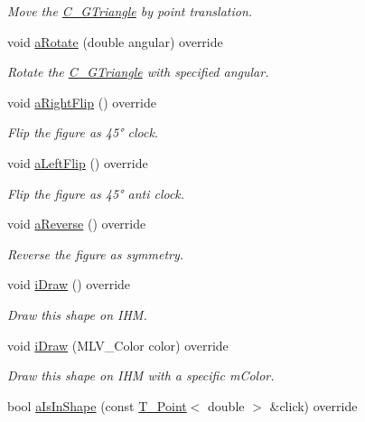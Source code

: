\begin{DoxyCompactItemize}
\begin{DoxyCompactList}\small\item\em Move the \hyperlink{classC__GTriangle}{C\+\_\+\+G\+Triangle} by point translation. \end{DoxyCompactList}\item 
void \hyperlink{classC__GTriangle_a29c641aea4ef5fa4224b42dffc5fefa5}{a\+Rotate} (double angular) override
\begin{DoxyCompactList}\small\item\em Rotate the \hyperlink{classC__GTriangle}{C\+\_\+\+G\+Triangle} with specified angular. \end{DoxyCompactList}\item 
void \hyperlink{classC__GTriangle_aa4f808a02ae18bd36c205a5d70eb3fef}{a\+Right\+Flip} () override
\begin{DoxyCompactList}\small\item\em Flip the figure as 45° clock. \end{DoxyCompactList}\item 
void \hyperlink{classC__GTriangle_a9ffdddb586b42757ffca6a9ca0c20934}{a\+Left\+Flip} () override
\begin{DoxyCompactList}\small\item\em Flip the figure as 45° anti clock. \end{DoxyCompactList}\item 
void \hyperlink{classC__GTriangle_a479646fa1265aaf2299b59787c394a27}{a\+Reverse} () override
\begin{DoxyCompactList}\small\item\em Reverse the figure as symmetry. \end{DoxyCompactList}\item 
void \hyperlink{classC__GTriangle_a53abbd8cd622323fc2f3b80ce91cfde9}{i\+Draw} () override
\begin{DoxyCompactList}\small\item\em Draw this shape on I\+HM. \end{DoxyCompactList}\item 
void \hyperlink{classC__GTriangle_a9cfd20cb1d19e6c92bd217c470c86405}{i\+Draw} (M\+L\+V\+\_\+\+Color color) override
\begin{DoxyCompactList}\small\item\em Draw this shape on I\+HM with a specific m\+Color. \end{DoxyCompactList}\item 
bool \hyperlink{classC__GTriangle_a417b28c74dd35f81a19b5bd1d214ba8d}{a\+Is\+In\+Shape} (const \hyperlink{classT__Point}{T\+\_\+\+Point}$<$ double $>$ \&click) override

\end{DoxyCompactItemize}

